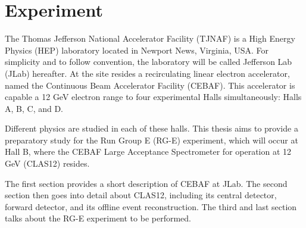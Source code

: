 \section{Experiment} \label{sec::experiment}
    The Thomas Jefferson National Accelerator Facility (TJNAF) is a High Energy Physics (HEP) laboratory located in Newport News, Virginia, USA.
    For simplicity and to follow convention, the laboratory will be called Jefferson Lab (JLab) hereafter.
    At the site resides a recirculating linear electron accelerator, named the Continuous Beam Accelerator Facility (CEBAF).
    This accelerator is capable a 12 GeV electron range to four experimental Halls simultaneously: Halls A, B, C, and D. %

    Different physics are studied in each of these halls.
    This thesis aims to provide a preparatory study for the Run Group E (RG-E) experiment, which will occur at Hall B, where the CEBAF Large Acceptance Spectrometer for operation at 12 GeV (CLAS12) resides.

    The first section provides a short description of CEBAF at JLab.
    The second section then goes into detail about CLAS12, including its central detector, forward detector, and its offline event reconstruction.
    The third and last section talks about the RG-E experiment to be performed.

    
    
    

